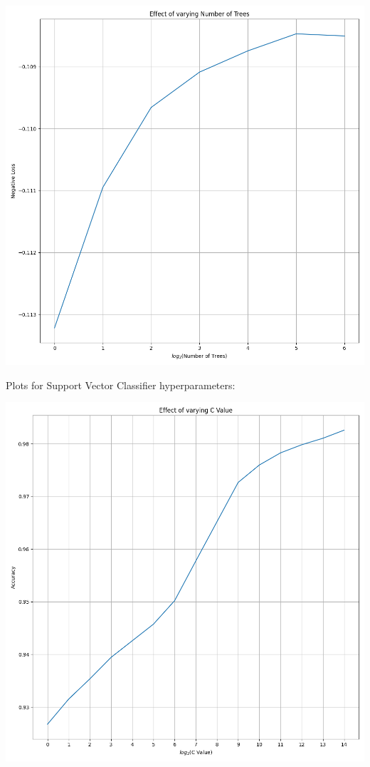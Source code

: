\documentclass[12pt, letterpaper]{article}
\begin{document}
\includegraphics[scale=\myscale]{random_forest_regressor_Number of Trees.png}

Plots for Support Vector Classifier hyperparameters:

\includegraphics[scale=\myscale]{svc_C Value.png}
\end{document}
